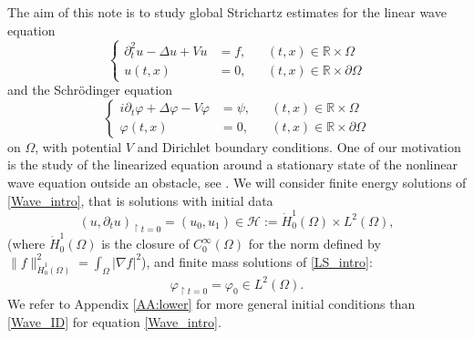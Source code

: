 \documentclass[10pt,leqno]{amsart}
\theoremstyle{definition}%
\theoremstyle{remark}
\numberwithin{equation}{section}
\newcommand{\R}{\mathbb{R}}
\renewcommand{\^}{\widehat}%
\begin{document}
The aim of this note is to study global Strichartz estimates for the linear wave equation
\begin{equation}
 \label{Wave_intro}
 \left\{\begin{aligned}
 \partial_t^2u-\Delta u+Vu&=f, &&(t,x)\in \R\times \Omega\\
 u(t,x)&=0, &&(t,x)\in \R\times \partial\Omega
 \end{aligned}
 \right.
 \end{equation} 
and the Schr\"odinger equation 
\begin{equation}
\label{LS_intro}
 \left\{\begin{aligned}
i\partial_t\varphi+\Delta \varphi-V\varphi&=\psi,&&(t,x)\in \R\times \Omega\\
\varphi(t,x)&=0,&&(t,x)\in \R\times \partial\Omega
 \end{aligned}
 \right.
\end{equation}
on $\Omega$, with potential $V$ and Dirichlet boundary conditions. One of our motivation is the study of the linearized equation around a stationary state of the nonlinear wave equation outside an obstacle, see \cite{DuyckaertsYang23Pb}. We will consider finite energy solutions of \eqref{Wave_intro}, that is solutions with initial data 
\begin{equation}
\label{Wave_ID}
(u,\partial_tu)_{\restriction t=0}=(u_0,u_1)\in \mathcal{H}:= \dot{H}^1_0(\Omega)\times L^2(\Omega),
\end{equation} 
(where $\dot{H}^1_0(\Omega)$ is the closure of $C^{\infty}_0(\Omega)$ for the norm defined by $\|f\|^2_{\dot{H}^1_0(\Omega)}=\int_{\Omega} |\nabla f|^2$),
and finite mass solutions of \eqref{LS_intro}:
\begin{equation}
 \label{LS_ID}
 \varphi_{\restriction t=0}=\varphi_0\in L^2(\Omega).
\end{equation}
We refer to Appendix \ref{AA:lower} for more general initial conditions than \eqref{Wave_ID} for equation \eqref{Wave_intro}.
\end{document}
